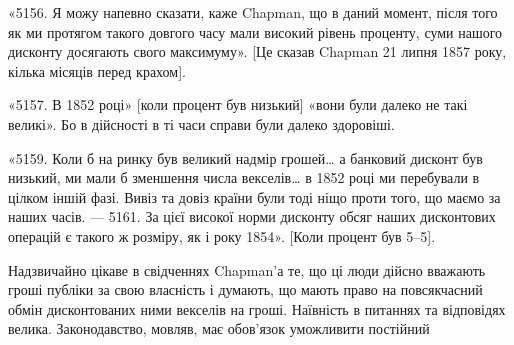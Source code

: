 «5156. Я можу напевно сказати, каже Chapman, що в даний момент, після
того як ми протягом такого довгого часу мали високий рівень проценту, суми
нашого дисконту досягають свого максимуму». [Це сказав Chapman 21 липня
1857 року, кілька місяців перед крахом].

«5157. В 1852 році» [коли процент був низький] «вони були далеко не
такі великі». Бо в дійсності в ті часи справи були далеко здоровіші.

«5159. Коли б на ринку був великий надмір грошей\dots{} а банковий дисконт
був низький, ми мали б зменшення числа векселів\dots{} в 1852 році ми
перебували в цілком іншій фазі. Вивіз та довіз країни були тоді ніщо проти
того, що маємо за наших часів. — 5161. За цієї високої норми дисконту обсяг
наших дисконтових операцій є такого ж розміру, як і року 1854». [Коли процент
був 5--5].

Надзвичайно цікаве в свідченнях Chapman’а те, що ці люди дійсно вважають
гроші публіки за свою власність і думають, що мають право на повсякчасний
обмін дисконтованих ними векселів на гроші. Наївність в питаннях
та відповідях велика. Законодавство, мовляв, має обов’язок уможливити постійний
\parbreak{}  %
